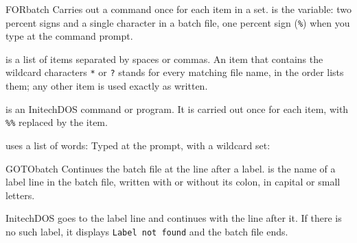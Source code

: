\begin{DosEntry}{FOR}{}{batch}
\Purpose Carries out a command once for each item in a set.
\Format {}
\Remarks
{} is the variable: two percent signs and a single character in
a batch file, one percent sign (\texttt{\%}) when you type 
at the command prompt.

 is a list of items separated by spaces or commas.  An item
that contains the wildcard characters \texttt{*} or \texttt{?} stands for
every matching file name, in the order  lists them; any other item
is used exactly as written.

 is an InitechDOS command or program.  It is carried out once
for each item, with \texttt{\%\%} replaced by the item.

\Example
{} uses a list of words:
Typed at the prompt, with a wildcard set:
\end{DosEntry}

\begin{DosEntry}{GOTO}{}{batch}
\Purpose Continues the batch file at the line after a label.
\Format {}
\Remarks
{} is the name of a label line in the batch file, written with
or without its colon, in capital or small letters.

InitechDOS goes to the label line and continues with the line after it.  If
there is no such label, it displays \texttt{Label not found} and the batch
file ends.
\Example
{}
\end{DosEntry}

